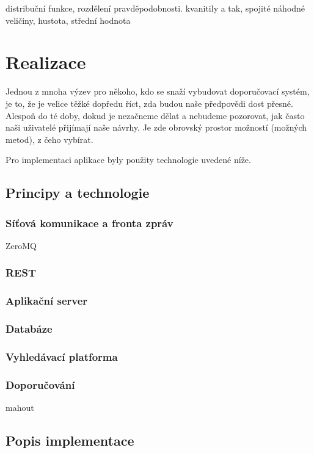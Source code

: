 \documentclass[thesis=M,czech]{FITthesis}[2014/05/07]
\begin{document}
distribuční funkce, rozdělení pravděpodobnosti. kvanitily a tak, spojité náhodné veličiny, hustota, střední hodnota
		
\chapter{Realizace}
\label{chap:impl}

Jednou z mnoha výzev pro někoho, kdo se snaží vybudovat doporučovací systém, je to, že je velice těžké dopředu říct, zda budou naše předpovědi dost přesné. Alespoň do té doby, dokud je nezačneme dělat a nebudeme pozorovat, jak často naši uživatelé přijímají naše návrhy. Je zde obrovský prostor možností (možných metod), z čeho vybírat. 

Pro implementaci aplikace byly použity technologie uvedené níže.

\section{Principy a technologie}
\label{sec:sysanalys}

\subsection{Síťová komunikace a fronta zpráv}
ZeroMQ

\subsection{REST}

\subsection{Aplikační server}

\subsection{Databáze}

\subsection{Vyhledávací platforma}

\subsection{Doporučování}
mahout

\section{Popis implementace}
\label{sec:impl}
\end{document}
